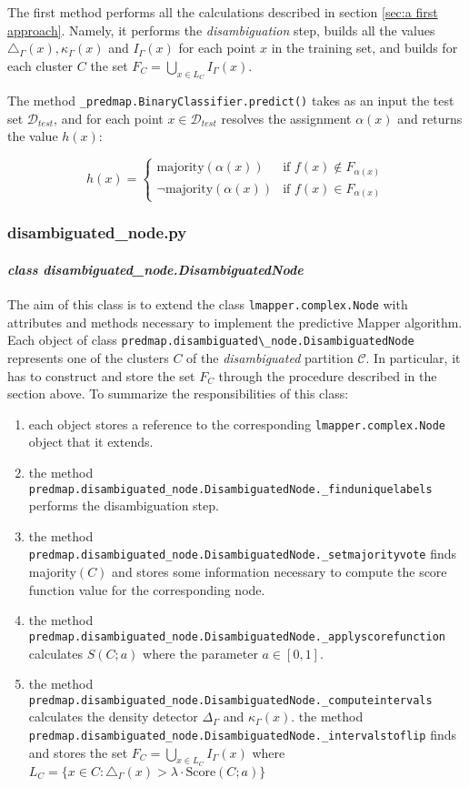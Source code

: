 The first method performs all the calculations described in section \ref{sec:a first approach}. Namely, it performs the \textit{disambiguation} step, builds all the values $\triangle_\Gamma(x), \kappa_\Gamma(x)$ and $I_\Gamma(x)$ for each point $x$ in the training set, and builds for each cluster $C$ the set $F_C=\bigcup_{x\in L_C} I_\Gamma(x)$. 

The method \lstinline|_predmap.BinaryClassifier.predict()| takes as an input the test set $\mathcal D_{test}$, and for each point $x\in \mathcal D_{test}$ resolves the assignment $\alpha(x)$ and returns the value $h(x)$:

$$h(x) = \begin{cases}
\text{majority}(\alpha(x))& \text{if } f(x)\notin F_{\alpha(x)}\\
\lnot\text{majority}(\alpha(x))& \text{if } f(x)\in F_{\alpha(x)}
\end{cases}$$

\subsubsection{disambiguated\_node.py}
\paragraph{\textit{class disambiguated\_node.DisambiguatedNode}}

The aim of this class is to extend the class \lstinline|lmapper.complex.Node| with attributes and methods necessary to implement the predictive Mapper algorithm. Each object of class \lstinline|predmap.disambiguated\_node.DisambiguatedNode| represents one of the clusters $C$ of the \textit{disambiguated} partition $\mathcal C$. In particular, it has to construct and store the set $F_C$ through the procedure described in the section above. To summarize the responsibilities of this class:
\begin{enumerate}
	\item each object stores a reference to the corresponding \lstinline|lmapper.complex.Node| object that it extends.
	\item the method \lstinline|predmap.disambiguated_node.DisambiguatedNode._finduniquelabels| performs the disambiguation step.
	\item the method \lstinline|predmap.disambiguated_node.DisambiguatedNode._setmajorityvote| finds majority$(C)$ and stores some information
	necessary to compute the score function value for the corresponding node.
	\item the method \lstinline|predmap.disambiguated_node.DisambiguatedNode._applyscorefunction| calculates $S(C; a)$ where the parameter $a\in[0,1]$.
	\item the method \lstinline|predmap.disambiguated_node.DisambiguatedNode._computeintervals| calculates the density detector $\Delta_\Gamma$ and $\kappa_\Gamma(x)$.
	the method \lstinline|predmap.disambiguated_node.DisambiguatedNode._intervalstoflip| finds and stores the set $F_C=\bigcup_{x\in L_C} I_\Gamma(x)$ where $L_C = \{x\in C: \triangle_\Gamma(x)>\lambda\cdot \text{Score}(C;a)\}$
\end{enumerate}
